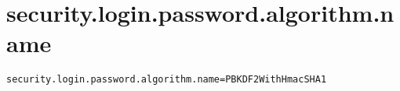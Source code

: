 \section{security.login.password.algorithm.name}
\label{configuration:SecurityLoginPasswordAlgorithmName}
\AvailableInJavaOnly{\TODO}
\begin{lstlisting}[style=Props,caption={Usage example for \textit{security.login.password.algorithm.name}}]
security.login.password.algorithm.name=PBKDF2WithHmacSHA1
\end{lstlisting}